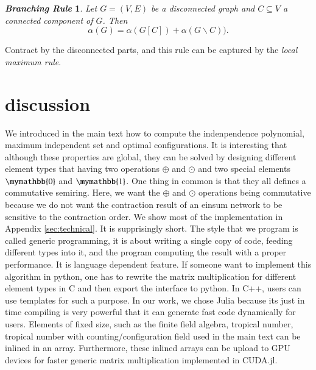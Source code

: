 \documentclass{article}
\newcommand{\<}{\langle}
\renewcommand{\>}{\rangle}
\newtheorem{theorem}{\textit{Branching Rule}}
\theoremstyle{definition}\newtheorem{definition}{\textit{Definition}}
\begin{document}
\begin{theorem}  %
Let $G = (V, E)$ be a disconnected graph and $C \subseteq V$ a connected component of $G$. Then
\begin{equation}
\alpha(G) = \alpha(G[C]) + \alpha(G \backslash C)).
\end{equation}
\end{theorem}
Contract by the disconnected parts, and this rule can be captured by the \textit{local maximum rule}.

\section{discussion}
We introduced in the main text how to compute the indenpendence polynomial, maximum independent set and optimal configurations.
It is interesting that although these properties are global,
they can be solved by designing different element types that having two operations $\oplus$ and $\odot$ and two special elements $\mymathbb{0}$ and $\mymathbb{1}$.
One thing in common is that they all defines a commutative semiring.
Here, we want the $\oplus$ and $\odot$ operations being commutative because we do not want the contraction result of an einsum network to be sensitive to the contraction order.
We show most of the implementation in Appendix \ref{sec:technical}. It is supprisingly short.
The style that we program is called generic programming,
it is about writing a single copy of code, feeding different types into it, and the program computing the result with a proper performance.
It is language dependent feature. If someone want to implement this algorithm in python,
one has to rewrite the matrix multiplication for different element types in C and then export the interface to python.
In C++, users can use templates for such a purpose.
In our work, we chose Julia because its just in time compiling is very powerful that it can generate fast code dynamically for users.
Elements of fixed size, such as the finite field algebra, tropical number, tropical number with counting/configuration field used in the main text can be inlined in an array.
Furthermore, these inlined arrays can be upload to GPU devices for faster generic matrix multiplication implemented in CUDA.jl.
\end{document}
